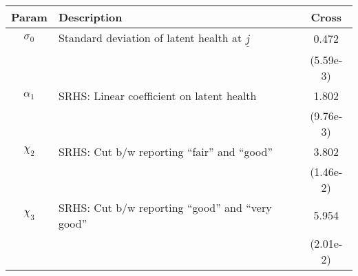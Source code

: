 \begin{table}[ht]\label{CrossWomenSRHSparams}
\footnotesize
\begin{center}
\begin{tabular}{clc}
\hline \hline
Param & Description & Cross \\
\hline
$\sigma_{0}$ & Standard deviation of latent health at $\underline{j}$ & 0.472 \\
 & & (5.59e-3) \\
$\alpha_1$ & SRHS: Linear coefficient on latent health & 1.802 \\
 & & (9.76e-3) \\
$\chi_2$ & SRHS: Cut b/w reporting ``fair'' and ``good'' & 3.802 \\
 & & (1.46e-2) \\
$\chi_3$ & SRHS: Cut b/w reporting ``good'' and ``very good'' & 5.954 \\
 & & (2.01e-2) \\
\hline\hline
\end{tabular}
\end{center}
\end{table}
